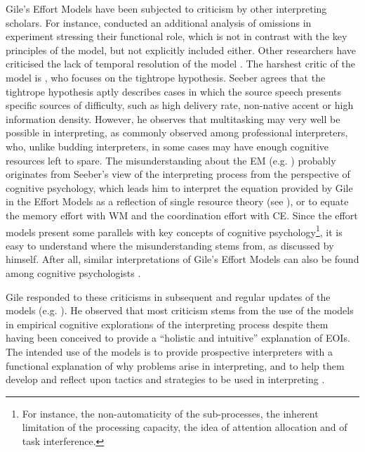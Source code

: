 Gile's Effort Models have been subjected to criticism by other interpreting scholars. For instance, \citet{pym_omission_2008} conducted an additional analysis of omissions in  experiment stressing their functional role, which is not in contrast with the key principles of the model, but not explicitly included either. Other researchers have criticised the lack of temporal resolution of the model \citep{pochhacker_introducing_2016}. The harshest critic of the model is \citet{seeber_cognitive_2011}, who focuses on the tightrope hypothesis. Seeber agrees that the tightrope hypothesis aptly describes cases in which the source speech presents specific sources of difficulty, such as high delivery rate, non-native accent or high information density. However, he observes that multitasking may very well be possible in interpreting, as commonly observed among professional interpreters, who, unlike budding interpreters, in some cases may have enough cognitive resources left to spare. The misunderstanding about the EM (e.g. \citealt{gile_effort_2017}) probably originates from Seeber's view of the interpreting process from the perspective of cognitive psychology, which leads him to interpret the equation provided by Gile in the Effort Models as a reflection of  single resource theory (see ), or to equate the memory effort with WM and the coordination effort with  CE. Since the effort models present some parallels with key concepts of cognitive psychology\footnote{For instance, the non-automaticity of the sub-processes, the inherent limitation of the processing capacity, the idea of attention allocation and of task interference.}, it is easy to understand where the misunderstanding stems from, as discussed by \citet{gile_basic_2009} himself. After all, similar interpretations of Gile's Effort Models can also be found among cognitive psychologists \citep{gile_basic_2009}.



Gile responded to these criticisms in subsequent and regular updates of the models (e.g. \citealt{gile_effort_2016, gile_effort_2017, gile_2020_2020}). He observed that most criticism stems from the use of the models in empirical cognitive explorations of the interpreting process despite them having been conceived to provide a ``holistic and intuitive'' \citep[10]{gile_effort_2017} explanation of EOIs. The intended use of the models is to provide prospective interpreters with a functional explanation of why problems arise in interpreting, and to help them develop and reflect upon tactics and strategies to be used in interpreting \citep{gile_2020_2020}.

